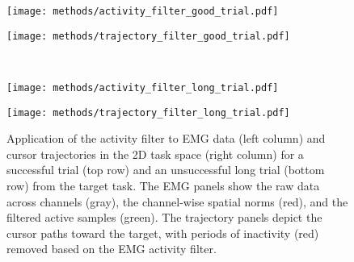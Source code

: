 \documentclass[../main.tex]{subfiles}
\begin{document}

\begin{figure}[!htb]
  \begin{minipage}[b]{0.6\linewidth}
    \centering
    \texttt{[image: methods/activity\_filter\_good\_trial.pdf]}
    \subcaption{}
    \vspace{4ex}
  \end{minipage}%
  \begin{minipage}[b]{0.4\linewidth}
    \centering
    \texttt{[image: methods/trajectory\_filter\_good\_trial.pdf]}
    \subcaption{}
    \vspace{4ex}
  \end{minipage}\\%
  \begin{minipage}[b]{0.6\linewidth}
    \centering
    \texttt{[image: methods/activity\_filter\_long\_trial.pdf]}
    \subcaption{}
    \vspace{4ex}
  \end{minipage}%
  \begin{minipage}[b]{0.4\linewidth}
    \centering
    \texttt{[image: methods/trajectory\_filter\_long\_trial.pdf]}
    \subcaption{}
    \vspace{4ex}
  \end{minipage}
  \caption[Activity filter for EMG and trajectories]{Application of the activity filter to EMG data (left column) and cursor trajectories in the 2D task space (right column) for a successful trial (top row) and an unsuccessful long trial (bottom row) from the target task. The EMG panels show the raw data across channels (gray), the channel-wise spatial norms (red), and the filtered active samples (green). The trajectory panels depict the cursor paths toward the target, with periods of inactivity (red) removed based on the EMG activity filter.}\label{fig:activity_filter}
\end{figure}





\cleardoublepage\printendnotes%
\ifSubfilesClassLoaded{%
    \newpage%
}{}%
\end{document}
